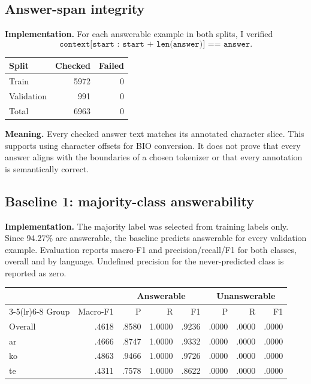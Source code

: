 \documentclass[11pt,a4paper]{article}
\begin{document}
\subsection{Answer-span integrity}
\textbf{Implementation.} For each answerable example in both splits, I verified
\[
\texttt{context[start : start + len(answer)] == answer}.
\]
\begin{center}
\begin{tabular}{lrr}
\toprule
Split & Checked & Failed \\
\midrule
Train & 5972 & 0 \\
Validation & 991 & 0 \\
Total & 6963 & 0 \\
\bottomrule
\end{tabular}
\end{center}
\textbf{Meaning.} Every checked answer text matches its annotated character slice. This supports using character offsets for BIO conversion. It does not prove that every answer aligns with the boundaries of a chosen tokenizer or that every annotation is semantically correct.

\subsection{Baseline 1: majority-class answerability}
\textbf{Implementation.} The majority label was selected from training labels only. Since 94.27\% are answerable, the baseline predicts answerable for every validation example. Evaluation reports macro-F1 and precision/recall/F1 for both classes, overall and by language. Undefined precision for the never-predicted class is reported as zero.

\begin{center}
\small
\begin{tabular}{lrrrrrrr}
\toprule
& & \multicolumn{3}{c}{Answerable} & \multicolumn{3}{c}{Unanswerable} \\
\cmidrule(lr){3-5}\cmidrule(lr){6-8}
Group & Macro-F1 & P & R & F1 & P & R & F1 \\
\midrule
Overall & .4618 & .8580 & 1.0000 & .9236 & .0000 & .0000 & .0000 \\
ar & .4666 & .8747 & 1.0000 & .9332 & .0000 & .0000 & .0000 \\
ko & .4863 & .9466 & 1.0000 & .9726 & .0000 & .0000 & .0000 \\
te & .4311 & .7578 & 1.0000 & .8622 & .0000 & .0000 & .0000 \\
\bottomrule
\end{tabular}
\end{center}
\end{document}
